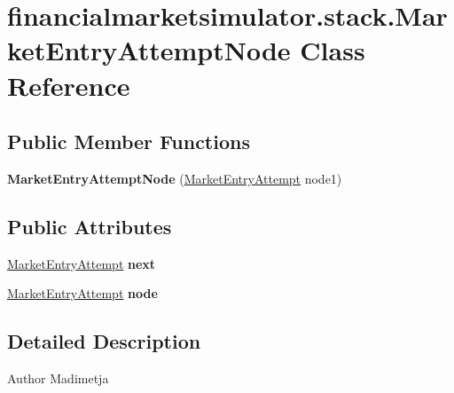 \hypertarget{classfinancialmarketsimulator_1_1stack_1_1_market_entry_attempt_node}{\section{financialmarketsimulator.\+stack.\+Market\+Entry\+Attempt\+Node Class Reference}
\label{classfinancialmarketsimulator_1_1stack_1_1_market_entry_attempt_node}
}
\subsection*{Public Member Functions}
\begin{DoxyCompactItemize}
\item 
\hypertarget{classfinancialmarketsimulator_1_1stack_1_1_market_entry_attempt_node_a1b07a62e05f0a51e7e77edbad7e1b07d}{{\bfseries Market\+Entry\+Attempt\+Node} (\hyperlink{classfinancialmarketsimulator_1_1_market_entry_attempt}{Market\+Entry\+Attempt} node1)}\label{classfinancialmarketsimulator_1_1stack_1_1_market_entry_attempt_node_a1b07a62e05f0a51e7e77edbad7e1b07d}

\end{DoxyCompactItemize}
\subsection*{Public Attributes}
\begin{DoxyCompactItemize}
\item 
\hypertarget{classfinancialmarketsimulator_1_1stack_1_1_market_entry_attempt_node_a9671342fa6e35efe9cbf03385e606f32}{\hyperlink{classfinancialmarketsimulator_1_1_market_entry_attempt}{Market\+Entry\+Attempt} {\bfseries next}}\label{classfinancialmarketsimulator_1_1stack_1_1_market_entry_attempt_node_a9671342fa6e35efe9cbf03385e606f32}

\item 
\hypertarget{classfinancialmarketsimulator_1_1stack_1_1_market_entry_attempt_node_a9a2784e51cab776b17f9957dbb2feb04}{\hyperlink{classfinancialmarketsimulator_1_1_market_entry_attempt}{Market\+Entry\+Attempt} {\bfseries node}}\label{classfinancialmarketsimulator_1_1stack_1_1_market_entry_attempt_node_a9a2784e51cab776b17f9957dbb2feb04}

\end{DoxyCompactItemize}


\subsection{Detailed Description}
\begin{DoxyAuthor}{Author}
Madimetja 
\end{DoxyAuthor}



